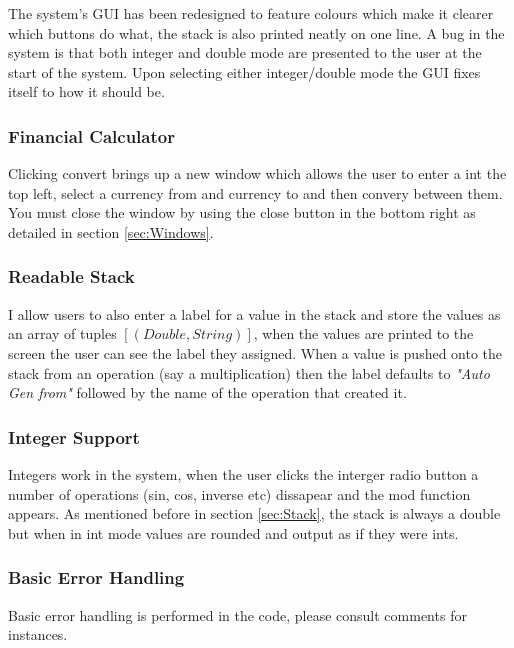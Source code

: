 \documentclass[12pt]{article} %
\begin{document}
The system's GUI has been redesigned to feature colours which make it clearer which buttons do what, the stack is also printed neatly on one line. A bug in the system is that both integer and double mode are presented to the user at the start of the system. Upon selecting either integer/double mode the GUI fixes itself to how it should be.
\subsubsection{Financial Calculator}

Clicking convert brings up a new window which allows the user to enter a int the top left, select a currency from and currency to and then convery between them. You must close the window by using the close button in the bottom right as detailed in section \ref{sec:Windows}.
\subsubsection{Readable Stack}

I allow users to also enter a label for a value in the stack and store the values as an array of tuples $[(Double, String)]$, when the values are printed to the screen the user can see the label they assigned. When a value is pushed onto the stack from an operation (say a multiplication) then the label defaults to \textit{"Auto Gen from"} followed by the name of the operation that created it.

\subsubsection{Integer Support}
Integers work in the system, when the user clicks the interger radio button a number of operations (sin, cos, inverse etc) dissapear and the mod function appears. As mentioned before in section \ref{sec:Stack}, the stack is always a double but when in int mode values are rounded and output as if they were ints.

\subsubsection{Basic Error Handling}
Basic error handling is performed in the code, please consult comments for instances.
\end{document}
